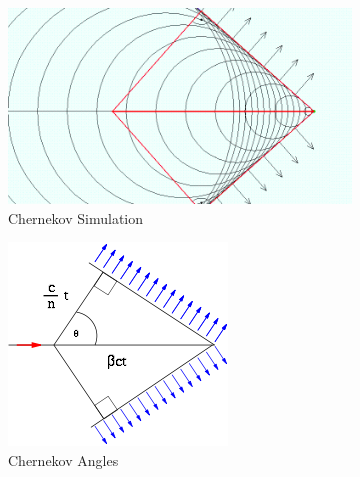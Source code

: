 \begin{figure}[H]
  \centering
  \begin{subfigure}[b]{0.45\textwidth}
      \includegraphics[width=\linewidth]{img/hadron/particleid-chernekov-wavefronts.png}
      \caption{Chernekov Simulation}
  \end{subfigure}
  \begin{subfigure}[b]{0.30\textwidth}
      \includegraphics[width=\linewidth]{img/hadron/particleid-cherenkov-angles.png}
      \caption{Chernekov Angles}
  \end{subfigure}
  \begin{subfigure}[b]{0.45\textwidth}

\end{subfigure}
\end{figure}
